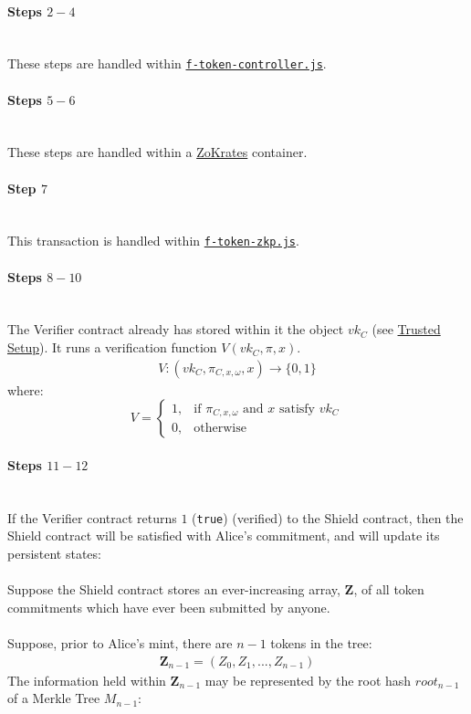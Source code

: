 \documentclass{article}
\begin{document}
\paragraph{Steps $2 - 4$}
\ \\
These steps are handled within \hyperref[sec:f-token-controller]{\texttt{f-token-controller.js}}.

\paragraph{Steps $5 - 6$}
\ \\
These steps are handled within a \hyperref[sec:zokrates]{ZoKrates} container.

\paragraph{Step $7$}
\ \\
This transaction is handled within \hyperref[sec:f-token-zkp]{\texttt{f-token-zkp.js}}.

\paragraph{Steps $8 - 10$}
\ \\
The Verifier contract already has stored within it the object $vk_C$ (see \hyperref[sec:trustedSetup]{Trusted Setup}). It runs a verification function $V(vk_C, \pi , x)$.
\begin{align*}
  V: (vk_C, \pi_{C,x,\omega}, x) \to \{0,1\}
\end{align*}
where:
\[
    V=
\begin{cases}
    1,& \text{if } \pi_{C,x,\omega} \text{ and } x \text{ satisfy } vk_C\\
    0,& \text{otherwise}
\end{cases}
\]




\paragraph{Steps $11 - 12$}
\ \\
If the Verifier contract returns $1$ (\texttt{true}) (verified) to the Shield contract, then the Shield contract will be satisfied with Alice's commitment, and will update its persistent states:\\
\\
Suppose the Shield contract stores an ever-increasing array, $\bm{Z}$, of all token commitments which have ever been submitted by anyone.\\
\\
Suppose, prior to Alice's mint, there are $n-1$ tokens in the tree:
\begin{align*}
  \bm{Z}_{n-1} = (Z_0, Z_1, ..., Z_{n-1})
\end{align*}
The information held within $\bm{Z}_{n-1}$ may be represented by the root hash $root_{n-1}$ of a Merkle Tree $M_{n-1}$:\\
\end{document}
